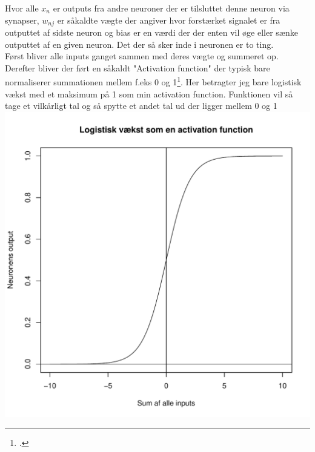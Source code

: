 Hvor alle $x_n$ er outputs fra andre neuroner der er tilsluttet denne neuron via synapser, $w_{nj}$ er såkaldte vægte der angiver hvor
forstærket signalet er fra outputtet af sidste neuron og bias er en værdi der der enten vil øge eller
sænke outputtet af en given neuron. Det der så sker inde i neuronen er to ting. \\
Først bliver alle inputs ganget sammen med deres vægte og summeret op. \\
Derefter bliver der ført en såkaldt "Activation function" der typisk bare normaliserer
summationen mellem f.eks 0 og 1\footcite{ANN11}. Her betragter jeg bare logistisk vækst med et maksimum på 1 som min activation function.
Funktionen vil så tage et vilkårligt tal og så spytte et andet tal ud der ligger mellem 0 og 1
\includegraphics[width=\textwidth]{diagrammer/sigmoid.pdf}
